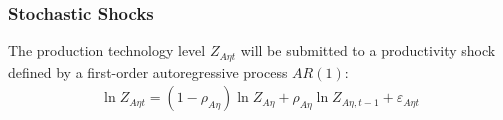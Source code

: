 \documentclass[../thesis.tex]{subfiles}
\begin{document}
\begin{comment}

where $P_t$ is the national price level, defined by:
\begin{align}
	P_{t} Y_{t} &= P_{1t} Y_{1t} + P_{2t} Y_{2t} \iff P_{t} = \frac{P_{1t} Y_{1t} + P_{2t} Y_{2t}}{Y_{t}} \label{eq_v2:reg-national-price-level}
\end{align}
	
	\begin{align}
		P_{t} Y_{t} &= P_{1t} Y_{1t} + P_{2t} Y_{2t} \implies \nonumber \\
		P_{t} &= \frac{Y_{1t}}{Y_{t}} P_{1t} + \frac{Y_{2t}}{Y_{t}} P_{2t} \implies \nonumber \\
		P_{t} &= \theta_{P1} P_{1t} + (1 -\theta_{P1}) P_{2t} %
	\end{align}
	
	where $\theta_{P1}$ and $(1-\theta_{P1})$ are the price level weights of regions 1 and 2 in the national price level composition, respectively:
	\begin{align}
		\left\langle \begin{matrix} \theta_{P1} & (1-\theta_{P1}) \end{matrix} \right\rangle \coloneq \left\langle \begin{matrix} \frac{Y_{1t}}{Yt} & \frac{Y_{2t}}{Yt} \end{matrix} \right\rangle \label{eq_v2:reg-ss-P1-P2-weight-in-P}
	\end{align}
\end{comment}


\subsubsection{Stochastic Shocks}\label{sec_v6:reg-stochastic-shocks}


The production technology level $Z_{A\eta t}$ will be submitted to a productivity shock defined by a first-order autoregressive process $AR(1)$:
\begin{align}
	\ln{Z_{A\eta t}} = (1-\rho_{A\eta})\ln{Z_{A\eta}} + \rho_{A\eta}\ln{Z_{A\eta,t-1}} + \varepsilon_{A\eta t} \label{eq_v2:reg-productivity-shock}
\end{align}
\end{document}
